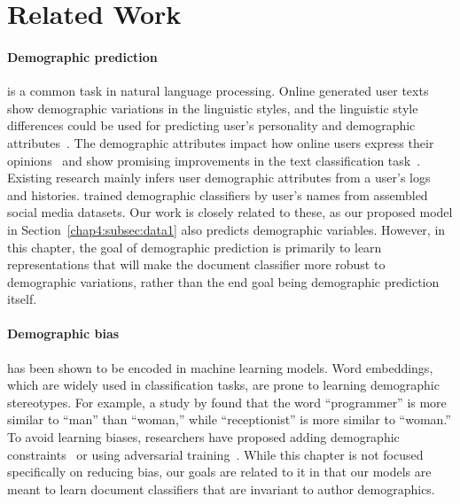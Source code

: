 \section{Related Work}

\paragraph{Demographic prediction}
is a common task in natural language processing.
Online generated user texts show demographic variations in the linguistic styles, and the linguistic style differences could be used for predicting user's personality and demographic attributes~\cite{rosenthal2011age, zhang2016predicting, hovy2018improving, wood2020using, gjurkovic2020pandora, lynn2020hierarchical}. 
The demographic attributes impact how online users express their opinions~\cite{volkova2013exploring, hovy2015demographic, wood2017does} and show promising improvements in the text classification task~\cite{lynn2017human, lynn2019tweet}.
Existing research mainly infers user demographic attributes from a user's logs and histories.
\cite{wood2020using} trained demographic classifiers by user's names from assembled social media datasets.
Our work is closely related to these, as our proposed model in Section~\ref{chap4:subsec:data1} also predicts demographic variables.
However, in this chapter, the goal of demographic prediction is primarily to learn representations that will make the document classifier more robust to demographic variations, rather than the end goal being demographic prediction itself.

\paragraph{Demographic bias}
has been shown to be encoded in machine learning models. Word embeddings, which are widely used in classification tasks, are prone to learning demographic stereotypes. 
For example, a study by \cite{bolukbasi2016man} found that the word ``programmer'' is more similar to ``man'' than ``woman,'' while ``receptionist'' is more similar to ``woman.''
To avoid learning biases, researchers have proposed adding demographic constraints~\cite{zhao2017men} or using adversarial training~\cite{elazar2018adversarial}. 
While this chapter is not focused specifically on reducing bias,
our goals are related to it in that our models are meant to learn document classifiers that are invariant to author demographics.

